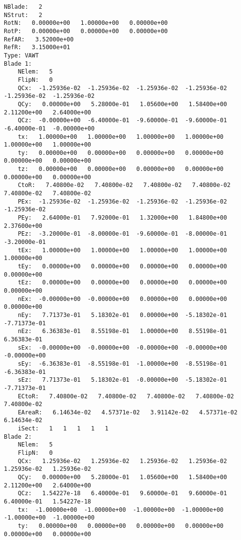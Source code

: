 \begin{lstlisting}
NBlade:   2 
NStrut:   2 
RotN:   0.00000e+00   1.00000e+00   0.00000e+00 
RotP:   0.00000e+00   0.00000e+00   0.00000e+00 
RefAR:   3.52000e+00 
RefR:   3.15000e+01 
Type: VAWT
Blade 1: 
    NElem:   5 
    FlipN:   0 
    QCx:  -1.25936e-02  -1.25936e-02  -1.25936e-02  -1.25936e-02  -1.25936e-02  -1.25936e-02 
    QCy:   0.00000e+00   5.28000e-01   1.05600e+00   1.58400e+00   2.11200e+00   2.64000e+00 
    QCz:  -0.00000e+00  -6.40000e-01  -9.60000e-01  -9.60000e-01  -6.40000e-01  -0.00000e+00 
    tx:   1.00000e+00   1.00000e+00   1.00000e+00   1.00000e+00   1.00000e+00   1.00000e+00 
    ty:   0.00000e+00   0.00000e+00   0.00000e+00   0.00000e+00   0.00000e+00   0.00000e+00 
    tz:   0.00000e+00   0.00000e+00   0.00000e+00   0.00000e+00   0.00000e+00   0.00000e+00 
    CtoR:   7.40800e-02   7.40800e-02   7.40800e-02   7.40800e-02   7.40800e-02   7.40800e-02 
    PEx:  -1.25936e-02  -1.25936e-02  -1.25936e-02  -1.25936e-02  -1.25936e-02 
    PEy:   2.64000e-01   7.92000e-01   1.32000e+00   1.84800e+00   2.37600e+00 
    PEz:  -3.20000e-01  -8.00000e-01  -9.60000e-01  -8.00000e-01  -3.20000e-01 
    tEx:   1.00000e+00   1.00000e+00   1.00000e+00   1.00000e+00   1.00000e+00 
    tEy:   0.00000e+00   0.00000e+00   0.00000e+00   0.00000e+00   0.00000e+00 
    tEz:   0.00000e+00   0.00000e+00   0.00000e+00   0.00000e+00   0.00000e+00 
    nEx:  -0.00000e+00  -0.00000e+00   0.00000e+00   0.00000e+00   0.00000e+00 
    nEy:   7.71373e-01   5.18302e-01   0.00000e+00  -5.18302e-01  -7.71373e-01 
    nEz:   6.36383e-01   8.55198e-01   1.00000e+00   8.55198e-01   6.36383e-01 
    sEx:  -0.00000e+00  -0.00000e+00  -0.00000e+00  -0.00000e+00  -0.00000e+00 
    sEy:  -6.36383e-01  -8.55198e-01  -1.00000e+00  -8.55198e-01  -6.36383e-01 
    sEz:   7.71373e-01   5.18302e-01  -0.00000e+00  -5.18302e-01  -7.71373e-01 
    ECtoR:   7.40800e-02   7.40800e-02   7.40800e-02   7.40800e-02   7.40800e-02 
    EAreaR:   6.14634e-02   4.57371e-02   3.91142e-02   4.57371e-02   6.14634e-02 
    iSect:   1   1   1   1   1 
Blade 2: 
    NElem:   5 
    FlipN:   0 
    QCx:   1.25936e-02   1.25936e-02   1.25936e-02   1.25936e-02   1.25936e-02   1.25936e-02 
    QCy:   0.00000e+00   5.28000e-01   1.05600e+00   1.58400e+00   2.11200e+00   2.64000e+00 
    QCz:   1.54227e-18   6.40000e-01   9.60000e-01   9.60000e-01   6.40000e-01   1.54227e-18 
    tx:  -1.00000e+00  -1.00000e+00  -1.00000e+00  -1.00000e+00  -1.00000e+00  -1.00000e+00 
    ty:   0.00000e+00   0.00000e+00   0.00000e+00   0.00000e+00   0.00000e+00   0.00000e+00 

\end{lstlisting}
